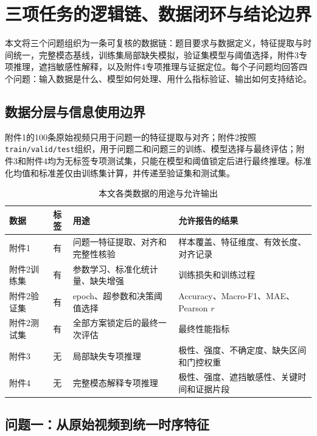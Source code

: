 \section{三项任务的逻辑链、数据闭环与结论边界}

本文将三个问题组织为一条可复核的数据链：题目要求与数据定义，特征提取与时间统一，完整模态基线，训练集局部缺失模拟，验证集模型与阈值选择，附件3专项推理，遮挡敏感性解释，以及附件4专项推理与证据定位。每个子问题均回答四个问题：输入数据是什么、模型如何处理、用什么指标验证、输出如何支持结论。

\subsection{数据分层与信息使用边界}

附件1的100条原始视频只用于问题一的特征提取与对齐；附件2按照\texttt{train/valid/test}组织，用于问题二和问题三的训练、模型选择与最终评估；附件3和附件4均为无标签专项测试集，只能在模型和阈值锁定后进行最终推理。标准化均值和标准差仅由训练集计算，并传递至验证集和测试集。

\begin{table}[htp!]
\centering\small\renewcommand{\arraystretch}{1.2}
\caption{本文各类数据的用途与允许输出}\label{tab:data_boundary}
\begin{tabularx}{\textwidth}{|l|c|X|X|}\hline
\textbf{数据} & \textbf{标签} & \textbf{用途} & \textbf{允许报告的结果} \\\hline
附件1 & 有 & 问题一特征提取、对齐和完整性核验 & 样本覆盖、特征维度、有效长度、对齐记录 \\\hline
附件2训练集 & 有 & 参数学习、标准化统计量、缺失增强 & 训练损失和训练过程 \\\hline
附件2验证集 & 有 & epoch、超参数和决策阈值选择 & Accuracy、Macro-F1、MAE、Pearson $r$ \\\hline
附件2测试集 & 有 & 全部方案锁定后的最终一次评估 & 最终性能指标 \\\hline
附件3 & 无 & 局部缺失专项推理 & 极性、强度、不确定度、缺失区间和门控权重 \\\hline
附件4 & 无 & 完整模态解释专项推理 & 极性、强度、遮挡敏感性、关键时间和证据片段 \\\hline
\end{tabularx}
\end{table}

\subsection{问题一：从原始视频到统一时序特征}

